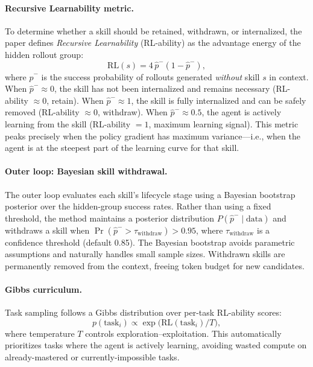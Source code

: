 \documentclass[11pt,a4paper]{article}
\begin{document}
\paragraph{Recursive Learnability metric.} To determine whether a skill should be retained, withdrawn, or internalized, the paper defines \emph{Recursive Learnability} (RL-ability) as the advantage energy of the hidden rollout group:
\begin{equation}
  \mathrm{RL}(s) = 4\,\hat{p}^{-}(1 - \hat{p}^{-}),
\end{equation}
where $\hat{p}^{-}$ is the success probability of rollouts generated \emph{without} skill $s$ in context. When $\hat{p}^{-} \approx 0$, the skill has not been internalized and remains necessary (RL-ability $\approx 0$, retain). When $\hat{p}^{-} \approx 1$, the skill is fully internalized and can be safely removed (RL-ability $\approx 0$, withdraw). When $\hat{p}^{-} \approx 0.5$, the agent is actively learning from the skill (RL-ability $= 1$, maximum learning signal). This metric peaks precisely when the policy gradient has maximum variance---i.e., when the agent is at the steepest part of the learning curve for that skill.

\paragraph{Outer loop: Bayesian skill withdrawal.} The outer loop evaluates each skill's lifecycle stage using a Bayesian bootstrap posterior over the hidden-group success rates. Rather than using a fixed threshold, the method maintains a posterior distribution $P(\hat{p}^{-} \mid \text{data})$ and withdraws a skill when $\Pr(\hat{p}^{-} > \tau_{\mathrm{withdraw}}) > 0.95$, where $\tau_{\mathrm{withdraw}}$ is a confidence threshold (default 0.85). The Bayesian bootstrap avoids parametric assumptions and naturally handles small sample sizes. Withdrawn skills are permanently removed from the context, freeing token budget for new candidates.

\paragraph{Gibbs curriculum.} Task sampling follows a Gibbs distribution over per-task RL-ability scores:
\begin{equation}
  p(\text{task}_i) \propto \exp\bigl(\mathrm{RL}(\text{task}_i) / T\bigr),
\end{equation}
where temperature $T$ controls exploration--exploitation. This automatically prioritizes tasks where the agent is actively learning, avoiding wasted compute on already-mastered or currently-impossible tasks.
\end{document}
